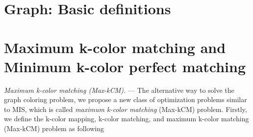 \documentclass[%
 reprint,
nofootinbib,
 amsmath,amssymb,
 aps,
pra,
floatfix,
]{revtex4-2}
\begin{document}



\clearpage


\onecolumngrid
\appendix

\section{Graph: Basic definitions }\label{appendix:graph-definition}


\section{Maximum k-color matching and Minimum k-color perfect matching} \label{Max-Min-kcm}

\emph{Maximum k-color matching {\rm (Max-kCM)}.} ---  The alternative way to solve the graph coloring problem, we propose a new class of optimization problems similar to MIS, which is called \emph{maximum k-color matching} (Max-kCM) problem. Firstly, we define the k-color mapping, k-color matching, and maximum k-color matching (Max-kCM) problem as following 
\end{document}
